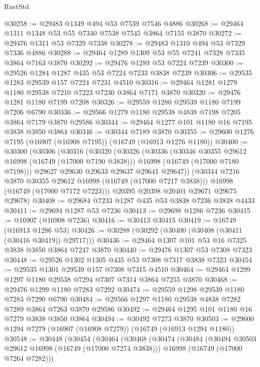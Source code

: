 \begin{lexlean}{RustStd}
\begin{coremodule}
@30258 := @29483 @1349 @494 @53 @7539 @7546 @4886
@30268 := @29464 @1311 @1348 @53 @55 @7340 @7538 @7545 @3864 @7155 @3870
@30272 := @29476 @1311 @53 @7329 @7338
@30278 := @29483 @1310 @494 @53 @7329 @7336 @4886
@30288 := @29464 @1289 @1309 @53 @55 @7241 @7328 @7335 @3864 @7163 @3870
@30292 := @29476 @1289 @53 @7224 @7239
@30300 := @29526 @1284 @1287 @435 @53 @7224 @7233 @3838 @7239
@30306 := @29535 @1283 @29539 @157 @7224 @7231 @4510
@30316 := @29464 @1281 @1279 @1180 @29538 @7210 @7223 @7230 @3864 @7171 @3870
@30320 := @29476 @1281 @1180 @7199 @7208
@30326 := @29559 @1280 @29539 @1180 @7199 @7206 @6790
@30336 := @29566 @1279 @1180 @29538 @4838 @7198 @7205 @3864 @7179 @3870 @29586
@30344 := @29464 @1277 @101 @1180 @16 @7195 @3838 @3850 @3864
@30346 := @30344 @7189 @3870
@30355 := @29600 @1276 @7195 (@16907 (@16908 @7195)) (@16749 (@16913 @1276 @1180))
@30400 := @30300
    (@30306
      (@30316
        (@30320
          (@30326
            (@30336
              (@30346 @30355 @29612 @16998 (@16749 (@17000 @7190 @3838)))
              @16998
              (@16749 (@17000 @7180 @7198)))
            @29627
            @29630
            @29633
            @29637
            @29641
            @29647))
        (@30344 @7216 @3870 @30355 @29612 @16998 (@16749 (@17000 @7217 @3838)))
        @16998
        (@16749 (@17000 @7172 @7223)))
      @20395
      @20398
      @20401
      @29671
      @29675
      @29678)
@30408 := @29684 @7233 @1287 @435 @53 @3838 @7236 @3838 @4433
@30411 := @29694 @1287 @53 @7236
@30413 := @29698 @1286 @7236
@30415 := @16907 (@16908 @7236)
@30416 := @30413 @30415
@30419 := @16749 (@16913 @1286 @53)
@30426 := @30288 (@30292 (@30400 (@30408 (@30411 (@30416 @30419)) @29717)))
@30436 := @29464 @1307 @101 @53 @16 @7325 @3838 @3850 @3864 @7247 @3870
@30440 := @29476 @1307 @53 @7308 @7323
@30448 := @29526 @1302 @1305 @435 @53 @7308 @7317 @3838 @7323
@30454 := @29535 @1301 @29539 @157 @7308 @7315 @4510
@30464 := @29464 @1299 @1297 @1180 @29538 @7294 @7307 @7314 @3864 @7255 @3870
@30468 := @29476 @1299 @1180 @7283 @7292
@30474 := @29559 @1298 @29539 @1180 @7283 @7290 @6790
@30484 := @29566 @1297 @1180 @29538 @4838 @7282 @7289 @3864 @7263 @3870 @29586
@30492 := @29464 @1295 @101 @1180 @16 @7279 @3838 @3850 @3864
@30494 := @30492 @7273 @3870
@30503 := @29600 @1294 @7279 (@16907 (@16908 @7279)) (@16749 (@16913 @1294 @1180))
@30548 := @30448
    (@30454
      (@30464
        (@30468
          (@30474
            (@30484
              (@30494 @30503 @29612 @16998 (@16749 (@17000 @7274 @3838)))
              @16998
              (@16749 (@17000 @7264 @7282)))

\end{coremodule}
\end{lexlean}
